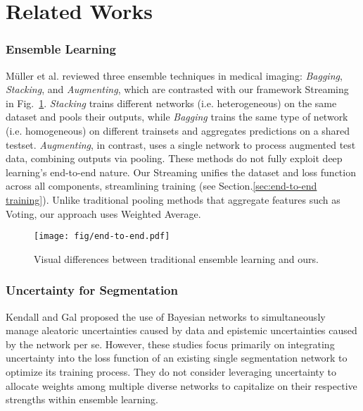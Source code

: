 \section{Related Works}
\subsubsection{Ensemble Learning}
Müller et al. \cite{muller2022analysis} reviewed three ensemble techniques in medical imaging: \textit{Bagging}, \textit{Stacking}, and \textit{Augmenting}, which are contrasted with our framework Streaming in Fig.~\ref{fig:end-to-end}. \textit{Stacking} trains different networks (i.e. heterogeneous) on the same dataset and pools their outputs, while \textit{Bagging} trains the same type of network (i.e. homogeneous) on different trainsets and aggregates predictions on a shared testset. \textit{Augmenting}, in contrast, uses a single network to process augmented test data, combining outputs via pooling. These methods do not fully exploit deep learning’s end-to-end nature. Our Streaming unifies the dataset and loss function across all components, streamlining training (see Section.\ref{sec:end-to-end training}). Unlike traditional pooling methods that aggregate features such as Voting, our approach uses Weighted Average.


\begin{figure}
    \centering
    \texttt{[image: fig/end-to-end.pdf]}
    \caption{Visual differences between traditional ensemble learning and ours.}
    \label{fig:end-to-end}
\end{figure}


\subsubsection{Uncertainty for Segmentation}
Kendall and Gal \cite{kendall2017uncertainties,li2017dropout, kendall2015bayesian} proposed the use of Bayesian networks to simultaneously manage aleatoric uncertainties caused by data and epistemic uncertainties caused by the network per se. However, these studies focus primarily on integrating uncertainty into the loss function of an existing single segmentation network to optimize its training process. They do not consider leveraging uncertainty to allocate weights among multiple diverse networks to capitalize on their respective strengths within ensemble learning.